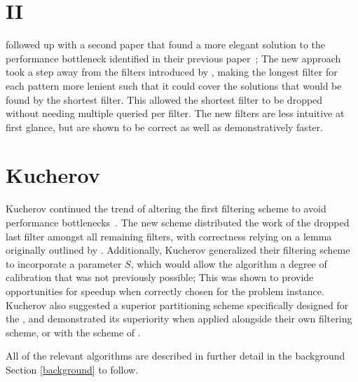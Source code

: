 \section{\vali{} II}

\vali{} followed up with a second paper that found a more elegant solution to the performance bottleneck identified in their previous paper~\cite{vali2012}; The new approach took a step away from the filters introduced by \kark{}, making the longest filter for each pattern more lenient such that it could cover the \glspl{solution} that would be found by the shortest filter. This allowed the shortest filter to be dropped without needing multiple queried per filter. The new filters are less intuitive at first glance, but are shown to be correct as well as demonstratively faster.

\section{Kucherov}

Kucherov continued the trend of altering the first \vali{} \gls{filtering scheme} to avoid performance bottlenecks~\cite{kuch2014}. The new scheme distributed the work of the dropped last filter amongst all remaining filters, with correctness relying on a lemma originally outlined by \kark{}. Additionally, Kucherov generalized their filtering scheme to incorporate a parameter $S$, which would allow the algorithm a degree of calibration that was not previously possible; This was shown to provide opportunities for speedup when correctly chosen for the problem instance. Kucherov also suggested a superior \gls{partitioning scheme} specifically designed for the \aspop{}, and demonstrated its superiority when applied alongside their own filtering scheme, or with the scheme of \vali{}.
 
All of the relevant algorithms are described in further detail in the background Section \ref{background} to follow.